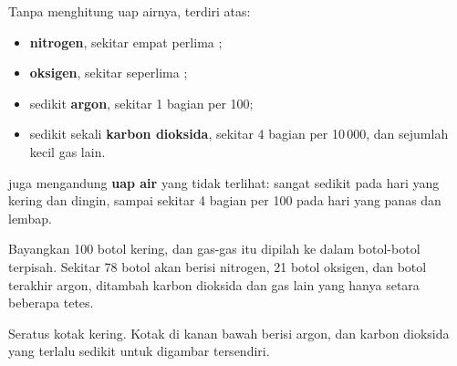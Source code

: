 \begin{proposition}\label{prop:g4:air-a-mixture-of-gases:composition}
Tanpa menghitung uap airnya,  terdiri atas:
\begin{itemize}
  \item \textbf{nitrogen}, sekitar empat perlima ;
  \item \textbf{oksigen}, sekitar seperlima ;
  \item sedikit \textbf{argon}, sekitar 1 bagian per 100;
  \item sedikit sekali \textbf{karbon dioksida}, sekitar 4 bagian per
        10\,000, dan sejumlah kecil gas lain.
\end{itemize}
 juga mengandung \textbf{uap air} yang tidak terlihat: sangat
sedikit pada hari yang kering dan dingin, sampai sekitar 4 bagian per
100 pada hari yang panas dan lembap.
\end{proposition}

\begin{example}\label{ex:g4:air-a-mixture-of-gases:hundred}
Bayangkan 100 botol  kering, dan gas-gas  itu dipilah ke dalam
botol-botol terpisah. Sekitar 78 botol akan berisi nitrogen, 21 botol
oksigen, dan botol terakhir argon, ditambah karbon dioksida dan gas lain
yang hanya setara beberapa tetes.
\end{example}

\begin{omfigure}

{\small Seratus kotak  kering. Kotak di kanan bawah berisi argon,
dan karbon dioksida yang terlalu sedikit untuk digambar tersendiri.}
\end{omfigure}

